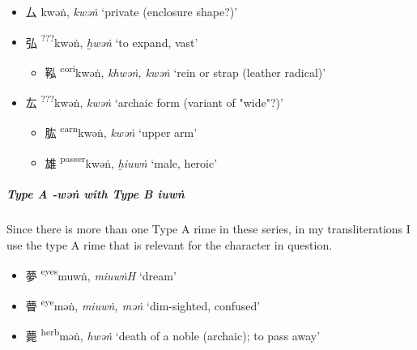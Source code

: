 \begin{itemize}
  \item {\Large{厶}} %
    {\large{kwəṅ}},
    \textit{kwəṅ} `private (enclosure shape?)' %

  \item {\Large{弘}} %
    {\large{{\textsuperscript{???}}kwəṅ}},
    \textit{ḫwəṅ} `to expand, vast' %

\begin{itemize}
    \item {\Large{鞃}} %
    {\large{{\textsuperscript{cori}}kwəṅ}},
    \textit{khwəṅ, kwəṅ} `rein or strap (leather radical)' %
\end{itemize}

  \item {\Large{厷}} %
    {\large{{\textsuperscript{???}}kwəṅ}},
    \textit{kwəṅ} `archaic form (variant of "wide"?)' %
\begin{itemize}
  \item {\Large{肱}} %
    {\large{{\textsuperscript{carn}}kwəṅ}},
    \textit{kwəṅ} `upper arm' %


  \item {\Large{雄}} %
    {\large{{\textsuperscript{passer}}kwəṅ}},
    \textit{ḫiuwṅ} `male, heroic' %

 
\end{itemize}
\end{itemize}



\subparagraph{Type A -\textit{wəṅ} with Type B \textit{iuwṅ}}
Since there is more than one Type A rime in these series, in my transliterations I use the type A rime that is relevant for the character in question.



\begin{itemize}
  \item {\Large{夢}} %
    {\large{{\textsuperscript{eyes}}muwṅ}},
    \textit{miuwṅH} `dream' %

  \item {\Large{瞢}} %
    {\large{{\textsuperscript{eye}}məṅ}},
    \textit{miuwṅ, məṅ} `dim-sighted, confused' %

  \item {\Large{薨}} %
    {\large{{\textsuperscript{herb}}məṅ}},
    \textit{hwəṅ} `death of a noble (archaic); to pass away' %
\end{itemize}

